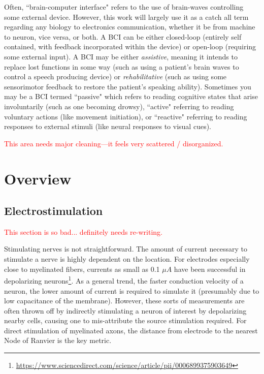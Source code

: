 Often, ``brain-computer interface" refers to the use of brain-waves controlling some external device. However, this work will largely use it as a catch all term regarding any biology to electronics communication, whether it be from machine to neuron, vice versa, or both. A BCI can be either closed-loop (entirely self contained, with feedback incorporated within the device) or open-loop (requiring some external input). A BCI may be either \textit{assistive}, meaning it intends to replace lost functions in some way (such as using a patient's brain waves to control a speech producing device) or \textit{rehabilitative} (such as using some sensorimotor feedback to restore the patient's speaking ability). Sometimes you may be a BCI termed ``passive" which refers to reading cognitive states that arise involuntarily (such as one becoming drowsy), ``active" referring to reading voluntary actions (like movement initiation), or ``reactive" referring to reading responses to external stimuli (like neural responses to visual cues).\newline




\textcolor{red}{This area needs major cleaning---it feels very scattered / disorganized.}\newline


\section{Overview}

\subsection{Electrostimulation}

\textcolor{red}{This section is so bad... definitely needs re-writing.}\newline

Stimulating nerves is not straightforward. The amount of current necessary to stimulate a nerve is highly dependent on the location. For electrodes especially close to myelinated fibers, currents as small as 0.1 $\mu A$ have been successful in depolarizing neurons\footnote{\url{https://www.sciencedirect.com/science/article/pii/0006899375903649}}. As a general trend, the faster conduction velocity of a neuron, the lower amount of current is required to simulate it (presumably due to low capacitance of the membrane). However, these sorts of measurements are often thrown off by indirectly stimulating a neuron of interest by depolarizing nearby cells, causing one to mis-attribute the source stimulation required. For direct stimulation of myelinated axons, the distance from electrode to the nearest Node of Ranvier is the key metric.\newline

